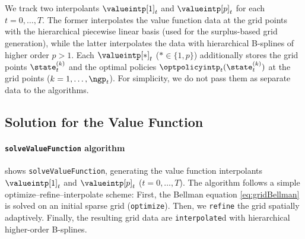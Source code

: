 We track two interpolants $\valueintp[1]_t$ and $\valueintp[p]_t$
for each $t = 0, \dotsc, T$.
The former interpolates the value function data at the grid points
with the hierarchical piecewise linear basis
(used for the surplus-based grid generation),
while the latter interpolates the data with hierarchical B-splines
of higher order $p > 1$.
Each $\valueintp[\ast]_t$ ($\ast \in \{1, p\}$)
additionally stores the grid points $\state_t^{(k)}$
and the optimal policies $\optpolicyintp_t(\state_t^{(k)})$
at the grid points ($k = 1, \dotsc, \ngp_t$).
For simplicity, we do not pass them as separate data
to the algorithms.



\subsection{Solution for the Value Function}
\label{sec:822solveValueFunction}

\paragraph{\texttt{solveValueFunction} algorithm}

 shows \texttt{solveValueFunction},
generating the value function interpolants
$\valueintp[1]_t$ and $\valueintp[p]_t$ ($t = 0, \dotsc, T$).
The algorithm follows a simple optimize--refine--interpolate scheme:
First, the Bellman equation \eqref{eq:gridBellman} is solved
on an initial sparse grid (\texttt{optimize}).
Then, we \texttt{refine} the grid spatially adaptively.
Finally, the resulting grid data are \texttt{interpolate}d
with hierarchical higher-order B-splines.

\begin{algorithm}
  \begin{algorithmic}[1]
      \EndFor{}
    \EndFunction{}
  \end{algorithmic}
  \caption[%
    Generation of value function interpolants (\texttt{solveValueFunction})%
  ]{%
    Generation of value function interpolants.
    The output is the higher-order B-spline interpolant $\valueintp[p]_t$
    for all $t = 0, \dotsc, T$.%
  }%
  \label{alg:financeSolveValueFunction}%
\end{algorithm}

